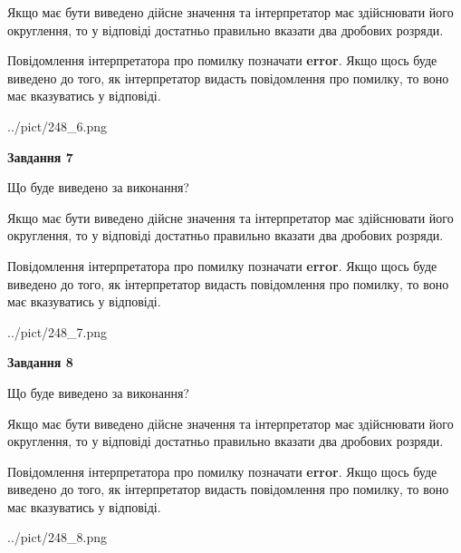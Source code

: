 \documentclass[12pt, ukrainian]{article}
\begin{document}
{\begin {Large}
Якщо має бути виведено дійсне значення та інтерпретатор має здійснювати його округлення, 
то у відповіді достатньо правильно вказати два дробових розряди.

Повідомлення інтерпретатора про помилку позначати \textbf{error}.
Якщо щось буде виведено до того, як інтерпретатор видасть повідомлення про помилку, 
то воно має вказуватись у відповіді. \par

\begin{center}
	{../pict/248_6.png}
\end{center}
\newpage

{\begin {center}\textbf{Завдання 7}\end {center}}\par
Що буде виведено за виконання? \par

Якщо має бути виведено дійсне значення та інтерпретатор має здійснювати його округлення, 
то у відповіді достатньо правильно вказати два дробових розряди.

Повідомлення інтерпретатора про помилку позначати \textbf{error}.
Якщо щось буде виведено до того, як інтерпретатор видасть повідомлення про помилку, 
то воно має вказуватись у відповіді. \par

\begin{center}
	{../pict/248_7.png}
\end{center}
\newpage

{\begin {center}\textbf{Завдання 8}\end {center}}\par
Що буде виведено за виконання? \par

Якщо має бути виведено дійсне значення та інтерпретатор має здійснювати його округлення, 
то у відповіді достатньо правильно вказати два дробових розряди.

Повідомлення інтерпретатора про помилку позначати \textbf{error}.
Якщо щось буде виведено до того, як інтерпретатор видасть повідомлення про помилку, 
то воно має вказуватись у відповіді. \par

\begin{center}
	{../pict/248_8.png}
\end{center}
\newpage


\end{Large}}
\end{document}
